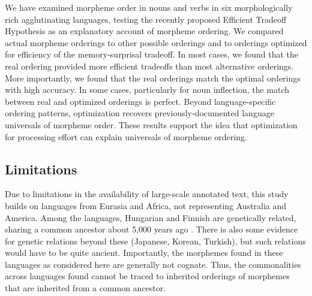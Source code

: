 \documentclass[11pt,letterpaper]{article}
\newcommand{\citep}{\parencite}
\newcommand\becky[1]{{\color{blue}(#1)}}
\begin{document}
We have examined morpheme order in nouns and verbs in six morphologically rich agglutinating languages, testing the recently proposed Efficient Tradeoff Hypothesis \citep{Hahn2020modeling} as an explanatory account of morpheme ordering.
We compared actual morpheme orderings to other possible orderings and to orderings optimized for efficiency of the memory-surprisal tradeoff.
In most cases, we found that the real ordering provided more efficient tradeoffs than most alternative orderings.
More importantly, we found that the real orderings match the optimal orderings with high accuracy.
In some cases, particularly for noun inflection, the match between real and optimized orderings is perfect.
Beyond language-specific ordering patterns, optimization recovers previously-documented language universals of morpheme order.
These results support the idea that optimization for processing effort can explain universals of morpheme ordering.





\subsection{Limitations}

Due to limitations in the availability of large-scale annotated text, this study builds on languages from Eurasia and Africa, not representing Australia and America.
Among the languages, Hungarian and Finnish are genetically related, sharing a common ancestor about 5,000 years ago \citep{maurits2020best}.
There is also some evidence for genetic relations beyond these (Japanese, Korean, Turkish), but such relations would have to be quite ancient.
Importantly, the morphemes found in these languages as considered here are generally not cognate.
Thus, the commonalities across languages found cannot be traced to inherited orderings of morphemes that are inherited from a common ancestor.


\end{document}
